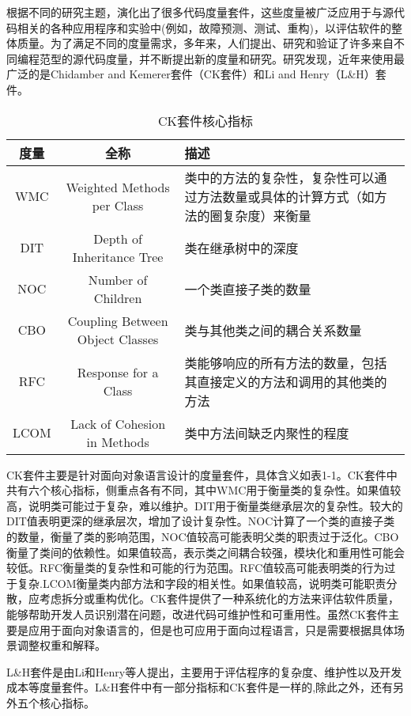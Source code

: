 根据不同的研究主题，演化出了很多代码度量套件，这些度量被广泛应用于与源代码相关的各种应用程序和实验中(例如，故障预测、测试、重构)，以评估软件的整体质量。为了满足不同的度量需求，多年来，人们提出、研究和验证了许多来自不同编程范型的源代码度量，并不断提出新的度量和研究。研究发现\cite{Ardito2020}，近年来使用最广泛的是Chidamber and Kemerer套件（CK套件）和Li and Henry（L&H）套件。



\begin{table}[htbp]
\caption{CK套件核心指标}
\vspace{0.5em}\centering\wuhao
\begin{tabular}{ccp{7.5cm}}
\toprule
度量 & 全称 & 描述 \\
\midrule
WMC & Weighted Methods per Class & 类中的方法的复杂性，复杂性可以通过方法数量或具体的计算方式（如方法的圈复杂度）来衡量 \\
DIT & Depth of Inheritance Tree & 类在继承树中的深度 \\
NOC & Number of Children & 一个类直接子类的数量 \\
CBO & Coupling Between Object Classes & 类与其他类之间的耦合关系数量  \\
RFC & Response for a Class & 类能够响应的所有方法的数量，包括其直接定义的方法和调用的其他类的方法  \\
LCOM & Lack of Cohesion in Methods & 类中方法间缺乏内聚性的程度  \\
\bottomrule
\end{tabular}
\end{table}

CK套件主要是针对面向对象语言设计的度量套件，具体含义如表1-1。CK套件中共有六个核心指标，侧重点各有不同，其中WMC用于衡量类的复杂性。如果值较高，说明类可能过于复杂，难以维护。DIT用于衡量类继承层次的复杂性。较大的DIT值表明更深的继承层次，增加了设计复杂性。NOC计算了一个类的直接子类的数量，衡量了类的影响范围，NOC值较高可能表明父类的职责过于泛化。CBO衡量了类间的依赖性。如果值较高，表示类之间耦合较强，模块化和重用性可能会较低。RFC衡量类的复杂性和可能的行为范围。RFC值较高可能表明类的行为过于复杂.LCOM衡量类内部方法和字段的相关性。如果值较高，说明类可能职责分散，应考虑拆分或重构优化。CK套件提供了一种系统化的方法来评估软件质量，能够帮助开发人员识别潜在问题，改进代码可维护性和可重用性。虽然CK套件主要是应用于面向对象语言的，但是也可应用于面向过程语言，只是需要根据具体场景调整权重和解释。

L\&H套件是由Li和Henry等人提出\cite{1993Object}，主要用于评估程序的复杂度、维护性以及开发成本等度量套件。L&H套件中有一部分指标和CK套件是一样的,除此之外，还有另外五个核心指标。 

